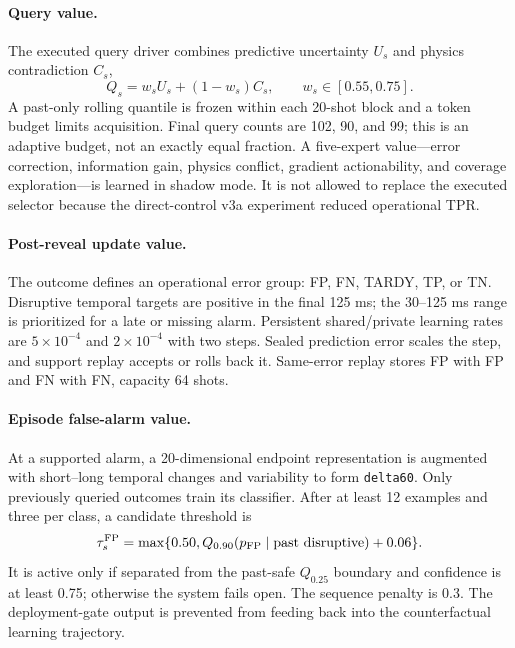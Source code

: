 \documentclass[10pt]{article}
\newcommand{\code}[1]{\nolinkurl{#1}}
\begin{document}
\paragraph{Query value.}
The executed query driver combines predictive uncertainty $U_s$ and physics contradiction $C_s$,
\begin{equation}
Q_s=w_sU_s+(1-w_s)C_s,\qquad w_s\in[0.55,0.75].
\end{equation}
A past-only rolling quantile is frozen within each 20-shot block and a token budget limits acquisition.  Final query counts are 102, 90, and 99; this is an adaptive budget, not an exactly equal fraction.  A five-expert value---error correction, information gain, physics conflict, gradient actionability, and coverage exploration---is learned in shadow mode.  It is not allowed to replace the executed selector because the direct-control v3a experiment reduced operational TPR.

\paragraph{Post-reveal update value.}
The outcome defines an operational error group: FP, FN, TARDY, TP, or TN.  Disruptive temporal targets are positive in the final 125 ms; the 30--125 ms range is prioritized for a late or missing alarm.  Persistent shared/private learning rates are $5\times10^{-4}$ and $2\times10^{-4}$ with two steps.  Sealed prediction error scales the step, and support replay accepts or rolls back it.  Same-error replay stores FP with FP and FN with FN, capacity 64 shots.

\paragraph{Episode false-alarm value.}
At a supported alarm, a 20-dimensional endpoint representation is augmented with short--long temporal changes and variability to form \code{delta60}.  Only previously queried outcomes train its classifier.  After at least 12 examples and three per class, a candidate threshold is
\begin{equation}
\tau_s^{\rm FP}=\max\{0.50,Q_{0.90}(p_{\rm FP}\mid\text{past disruptive})+0.06\}.
\end{equation}
It is active only if separated from the past-safe $Q_{0.25}$ boundary and confidence is at least 0.75; otherwise the system fails open.  The sequence penalty is 0.3.  The deployment-gate output is prevented from feeding back into the counterfactual learning trajectory.
\end{document}
